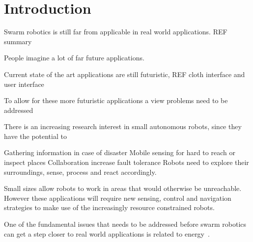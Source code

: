 \chapter{Introduction}
\label{chp:introduction}











Swarm robotics is still far from applicable in real world applications. REF summary

People imagine a lot of far future applications.

Current state of the art applications are still futuristic, REF cloth interface and user interface 

To allow for these more futuristic applications a view problems need to be addressed

There is an increasing research interest in small autonomous robots, since they have the potential to 



Gathering information in case of disaster
Mobile sensing for hard to reach or inspect places
Collaboration increase fault tolerance
Robots need to explore their surroundings, sense, process and react accordingly.

Small sizes allow robots to work in areas that would otherwise be unreachable. 
However these applications will require new sensing, control and navigation strategies to make use of the increasingly resource constrained robots.
	

One of the fundamental issues that needs to be addressed before swarm robotics can get a step closer to real world applications is related to energy~\cite{barca_sekercioglu_2013}.

